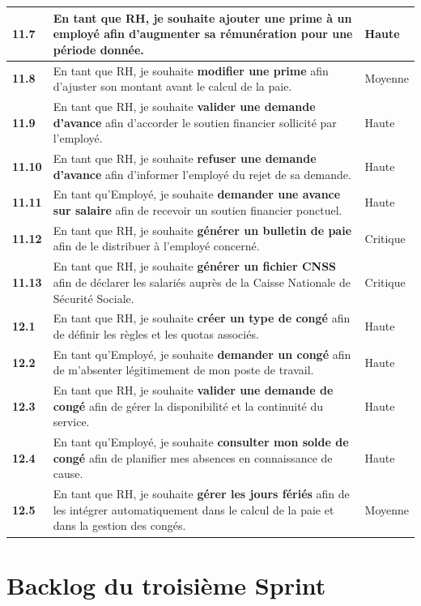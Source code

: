 \begin{small}
\begin{longtable}{|>{\bfseries}p{1.2cm}|p{9.5cm}|>{\centering\arraybackslash}p{2.5cm}|}
11.7 & En tant que RH, je souhaite \textbf{ajouter une prime} à un employé afin d'augmenter sa rémunération pour une période donnée. & Haute \\ \hline
11.8 & En tant que RH, je souhaite \textbf{modifier une prime} afin d'ajuster son montant avant le calcul de la paie. & Moyenne \\ \hline
11.9 & En tant que RH, je souhaite \textbf{valider une demande d'avance} afin d'accorder le soutien financier sollicité par l'employé. & Haute \\ \hline
11.10 & En tant que RH, je souhaite \textbf{refuser une demande d'avance} afin d'informer l'employé du rejet de sa demande. & Haute \\ \hline
11.11 & En tant qu'Employé, je souhaite \textbf{demander une avance sur salaire} afin de recevoir un soutien financier ponctuel. & Haute \\ \hline
11.12 & En tant que RH, je souhaite \textbf{générer un bulletin de paie} afin de le distribuer à l'employé concerné. & Critique \\ \hline
11.13 & En tant que RH, je souhaite \textbf{générer un fichier CNSS} afin de déclarer les salariés auprès de la Caisse Nationale de Sécurité Sociale. & Critique \\ \hline
12.1 & En tant que RH, je souhaite \textbf{créer un type de congé} afin de définir les règles et les quotas associés. & Haute \\ \hline
12.2 & En tant qu'Employé, je souhaite \textbf{demander un congé} afin de m'absenter légitimement de mon poste de travail. & Haute \\ \hline
12.3 & En tant que RH, je souhaite \textbf{valider une demande de congé} afin de gérer la disponibilité et la continuité du service. & Haute \\ \hline
12.4 & En tant qu'Employé, je souhaite \textbf{consulter mon solde de congé} afin de planifier mes absences en connaissance de cause. & Haute \\ \hline
12.5 & En tant que RH, je souhaite \textbf{gérer les jours fériés} afin de les intégrer automatiquement dans le calcul de la paie et dans la gestion des congés. & Moyenne \\

\end{longtable}
\end{small}
\renewcommand{\arraystretch}{1.0}

\section{Backlog du troisième Sprint}
\label{sec:s3-backlog}

